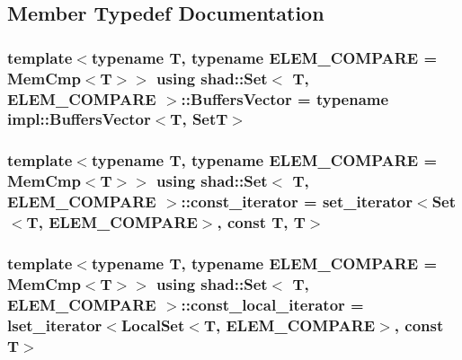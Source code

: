 \subsection{Member Typedef Documentation}
\hypertarget{classshad_1_1Set_ace82796db9a7938647d935452ea6d39c}{
\subsubsection[{Buffers\-Vector}]{\setlength{\rightskip}{0pt plus 5cm}template$<$typename T, typename E\-L\-E\-M\-\_\-\-C\-O\-M\-P\-A\-R\-E = Mem\-Cmp$<$\-T$>$$>$ using {\bf shad\-::\-Set}$<$ T, E\-L\-E\-M\-\_\-\-C\-O\-M\-P\-A\-R\-E $>$\-::{\bf Buffers\-Vector} =  typename impl\-::\-Buffers\-Vector$<$T, {\bf Set\-T}$>$}}\label{classshad_1_1Set_ace82796db9a7938647d935452ea6d39c}
\hypertarget{classshad_1_1Set_a0b2608f92f5397a25e62fad925fc177e}{
\subsubsection[{const\-\_\-iterator}]{\setlength{\rightskip}{0pt plus 5cm}template$<$typename T, typename E\-L\-E\-M\-\_\-\-C\-O\-M\-P\-A\-R\-E = Mem\-Cmp$<$\-T$>$$>$ using {\bf shad\-::\-Set}$<$ T, E\-L\-E\-M\-\_\-\-C\-O\-M\-P\-A\-R\-E $>$\-::{\bf const\-\_\-iterator} =  {\bf set\-\_\-iterator}$<${\bf Set}$<$T, E\-L\-E\-M\-\_\-\-C\-O\-M\-P\-A\-R\-E$>$, const T, T$>$}}\label{classshad_1_1Set_a0b2608f92f5397a25e62fad925fc177e}
\hypertarget{classshad_1_1Set_a0857d9ce7a249e860e3a67bc18f7de8b}{
\subsubsection[{const\-\_\-local\-\_\-iterator}]{\setlength{\rightskip}{0pt plus 5cm}template$<$typename T, typename E\-L\-E\-M\-\_\-\-C\-O\-M\-P\-A\-R\-E = Mem\-Cmp$<$\-T$>$$>$ using {\bf shad\-::\-Set}$<$ T, E\-L\-E\-M\-\_\-\-C\-O\-M\-P\-A\-R\-E $>$\-::{\bf const\-\_\-local\-\_\-iterator} =  {\bf lset\-\_\-iterator}$<${\bf Local\-Set}$<$T, E\-L\-E\-M\-\_\-\-C\-O\-M\-P\-A\-R\-E$>$, const T$>$}}\label{classshad_1_1Set_a0857d9ce7a249e860e3a67bc18f7de8b}
